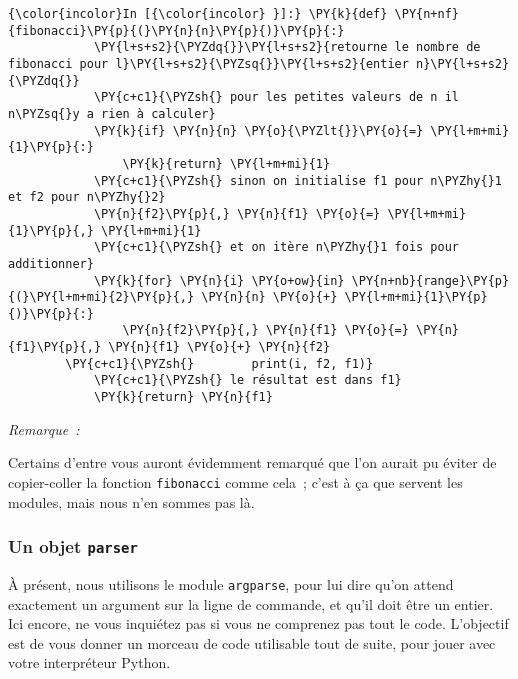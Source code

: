     \begin{Verbatim}[commandchars=\\\{\}]
{\color{incolor}In [{\color{incolor} }]:} \PY{k}{def} \PY{n+nf}{fibonacci}\PY{p}{(}\PY{n}{n}\PY{p}{)}\PY{p}{:}
            \PY{l+s+s2}{\PYZdq{}}\PY{l+s+s2}{retourne le nombre de fibonacci pour l}\PY{l+s+s2}{\PYZsq{}}\PY{l+s+s2}{entier n}\PY{l+s+s2}{\PYZdq{}}
            \PY{c+c1}{\PYZsh{} pour les petites valeurs de n il n\PYZsq{}y a rien à calculer}
            \PY{k}{if} \PY{n}{n} \PY{o}{\PYZlt{}}\PY{o}{=} \PY{l+m+mi}{1}\PY{p}{:}
                \PY{k}{return} \PY{l+m+mi}{1}
            \PY{c+c1}{\PYZsh{} sinon on initialise f1 pour n\PYZhy{}1 et f2 pour n\PYZhy{}2}
            \PY{n}{f2}\PY{p}{,} \PY{n}{f1} \PY{o}{=} \PY{l+m+mi}{1}\PY{p}{,} \PY{l+m+mi}{1}
            \PY{c+c1}{\PYZsh{} et on itère n\PYZhy{}1 fois pour additionner}
            \PY{k}{for} \PY{n}{i} \PY{o+ow}{in} \PY{n+nb}{range}\PY{p}{(}\PY{l+m+mi}{2}\PY{p}{,} \PY{n}{n} \PY{o}{+} \PY{l+m+mi}{1}\PY{p}{)}\PY{p}{:}
                \PY{n}{f2}\PY{p}{,} \PY{n}{f1} \PY{o}{=} \PY{n}{f1}\PY{p}{,} \PY{n}{f1} \PY{o}{+} \PY{n}{f2}
        \PY{c+c1}{\PYZsh{}        print(i, f2, f1)}
            \PY{c+c1}{\PYZsh{} le résultat est dans f1}
            \PY{k}{return} \PY{n}{f1}
\end{Verbatim}


    \emph{Remarque~:}

Certains d'entre vous auront évidemment remarqué que l'on aurait pu
éviter de copier-coller la fonction \texttt{fibonacci} comme cela~;
c'est à ça que servent les modules, mais nous n'en sommes pas là.

    \hypertarget{un-objet-parser}{%
\subsubsection{\texorpdfstring{Un objet
\texttt{parser}}{Un objet parser}}\label{un-objet-parser}}

    À présent, nous utilisons le module \texttt{argparse}, pour lui dire
qu'on attend exactement un argument sur la ligne de commande, et qu'il
doit être un entier. Ici encore, ne vous inquiétez pas si vous ne
comprenez pas tout le code. L'objectif est de vous donner un morceau de
code utilisable tout de suite, pour jouer avec votre interpréteur
Python.

